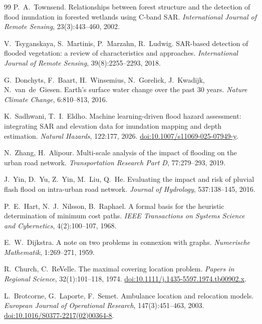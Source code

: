 \documentclass[10pt,twocolumn]{article}
\begin{document}
{\begin{thebibliography}{99}
P.~A.~Townsend.
Relationships between forest structure and the detection of flood inundation in
forested wetlands using C-band SAR.
\emph{International Journal of Remote Sensing}, 23(3):443--460, 2002.

V.~Tsyganskaya, S.~Martinis, P.~Marzahn, R.~Ludwig.
SAR-based detection of flooded vegetation: a review of characteristics and
approaches.
\emph{International Journal of Remote Sensing}, 39(8):2255--2293, 2018.

G.~Donchyts, F.~Baart, H.~Winsemius, N.~Gorelick, J.~Kwadijk, N.~van~de~Giesen.
Earth's surface water change over the past 30 years.
\emph{Nature Climate Change}, 6:810--813, 2016.

K.~Sadhwani, T.~I.~Eldho.
Machine learning-driven flood hazard assessment: integrating SAR and elevation
data for inundation mapping and depth estimation.
\emph{Natural Hazards}, 122:177, 2026.
\href{https://doi.org/10.1007/s11069-025-07949-y}{doi:10.1007/s11069-025-07949-y}.

N.~Zhang, H.~Alipour.
Multi-scale analysis of the impact of flooding on the urban road network.
\emph{Transportation Research Part D}, 77:279--293, 2019.

J.~Yin, D.~Yu, Z.~Yin, M.~Liu, Q.~He.
Evaluating the impact and risk of pluvial flash flood on intra-urban road network.
\emph{Journal of Hydrology}, 537:138--145, 2016.

P.~E.~Hart, N.~J.~Nilsson, B.~Raphael.
A formal basis for the heuristic determination of minimum cost paths.
\emph{IEEE Transactions on Systems Science and Cybernetics}, 4(2):100--107, 1968.

E.~W.~Dijkstra.
A note on two problems in connexion with graphs.
\emph{Numerische Mathematik}, 1:269--271, 1959.

R.~Church, C.~ReVelle.
The maximal covering location problem.
\emph{Papers in Regional Science}, 32(1):101--118, 1974.
\href{https://doi.org/10.1111/j.1435-5597.1974.tb00902.x}{doi:10.1111/j.1435-5597.1974.tb00902.x}.

L.~Brotcorne, G.~Laporte, F.~Semet.
Ambulance location and relocation models.
\emph{European Journal of Operational Research}, 147(3):451--463, 2003.
\href{https://doi.org/10.1016/S0377-2217(02)00364-8}{doi:10.1016/S0377-2217(02)00364-8}.


\end{thebibliography}}
\end{document}
